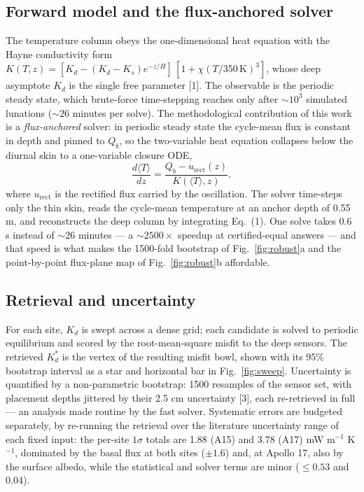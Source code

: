 \documentclass[10pt,a4paper]{article}
\begin{document}
\subsection{Forward model and the flux-anchored solver}
The temperature column obeys the one-dimensional heat equation with the
Hayne conductivity form
$K(T,z) = [K_d - (K_d - K_s)e^{-z/H}]\,[1 + \chi (T/350\,\mathrm{K})^3]$,
whose deep asymptote $K_d$ is the single free parameter [1]. The
observable is the periodic steady state, which brute-force
time-stepping reaches only after ${\sim}10^3$ simulated lunations
(${\sim}26$ minutes per solve). The methodological contribution of this
work is a \textit{flux-anchored} solver: in periodic steady state the
cycle-mean flux is constant in depth and pinned to $Q_b$, so the
two-variable heat equation collapses below the diurnal skin to a
one-variable closure ODE,
\begin{equation}
\frac{d\langle T\rangle}{dz}
   = \frac{Q_b - u_{\mathrm{rect}}(z)}{K(\langle T\rangle, z)},
\end{equation}
where $u_{\mathrm{rect}}$ is the rectified flux carried by the
oscillation. The solver time-steps only the thin skin, reads the
cycle-mean temperature at an anchor depth of 0.55 m, and reconstructs
the deep column by integrating Eq.~(1). One solve takes 0.6 s instead
of ${\sim}26$ minutes --- a ${\sim}2500\times$ speedup at
certified-equal answers --- and that speed is what makes the 1500-fold
bootstrap of Fig.~\ref{fig:robust}a and the point-by-point flux-plane
map of Fig.~\ref{fig:robust}b affordable.

\subsection{Retrieval and uncertainty}
For each site, $K_d$ is swept across a dense grid; each candidate is
solved to periodic equilibrium and scored by the root-mean-square
misfit to the deep sensors. The retrieved $K_d^{*}$ is the vertex of
the resulting misfit bowl, shown with its 95\% bootstrap interval as a
star and horizontal bar in Fig.~\ref{fig:sweep}. Uncertainty is
quantified by a non-parametric bootstrap: 1500 resamples of the sensor
set, with placement depths jittered by their 2.5 cm uncertainty [3],
each re-retrieved in full --- an analysis made routine by the fast
solver. Systematic errors are budgeted separately, by re-running the
retrieval over the literature uncertainty range of each fixed input:
the per-site $1\sigma$ totals are 1.88 (A15) and 3.78 (A17)
mW m$^{-1}$ K$^{-1}$, dominated by the basal flux at both sites
($\pm 1.6$) and, at Apollo 17, also by the surface albedo, while the
statistical and solver terms are minor ($\leq 0.53$ and 0.04).
\end{document}
